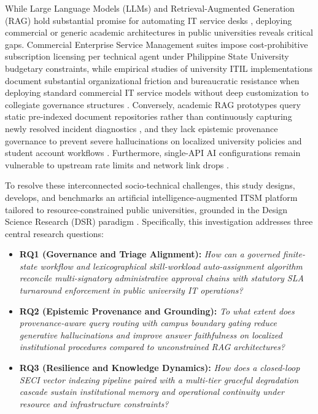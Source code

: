 \documentclass[conference]{IEEEtran}
\begin{document}
While Large Language Models (LLMs) and Retrieval-Augmented Generation (RAG) \cite{ref4} hold substantial promise for automating IT service desks \cite{ref5}, deploying commercial or generic academic architectures in public universities reveals critical gaps. Commercial Enterprise Service Management suites impose cost-prohibitive subscription licensing per technical agent under Philippine State University budgetary constraints, while empirical studies of university ITIL implementations document substantial organizational friction and bureaucratic resistance when deploying standard commercial IT service models without deep customization to collegiate governance structures \cite{ref6, ref7}. Conversely, academic RAG prototypes query static pre-indexed document repositories rather than continuously capturing newly resolved incident diagnostics \cite{ref5, ref8}, and they lack epistemic provenance governance to prevent severe hallucinations on localized university policies and student account workflows \cite{ref9, ref10}. Furthermore, single-API AI configurations remain vulnerable to upstream rate limits and network link drops \cite{ref20}.

To resolve these interconnected socio-technical challenges, this study designs, develops, and benchmarks an artificial intelligence-augmented ITSM platform tailored to resource-constrained public universities, grounded in the Design Science Research (DSR) paradigm \cite{ref11, ref12}. Specifically, this investigation addresses three central research questions:
\begin{itemize}
    \item \textbf{RQ1 (Governance and Triage Alignment):} \textit{How can a governed finite-state workflow and lexicographical skill-workload auto-assignment algorithm reconcile multi-signatory administrative approval chains with statutory SLA turnaround enforcement in public university IT operations?}
    \item \textbf{RQ2 (Epistemic Provenance and Grounding):} \textit{To what extent does provenance-aware query routing with campus boundary gating reduce generative hallucinations and improve answer faithfulness on localized institutional procedures compared to unconstrained RAG architectures?}
    \item \textbf{RQ3 (Resilience and Knowledge Dynamics):} \textit{How does a closed-loop SECI vector indexing pipeline paired with a multi-tier graceful degradation cascade sustain institutional memory and operational continuity under resource and infrastructure constraints?}
\end{itemize}
\end{document}
